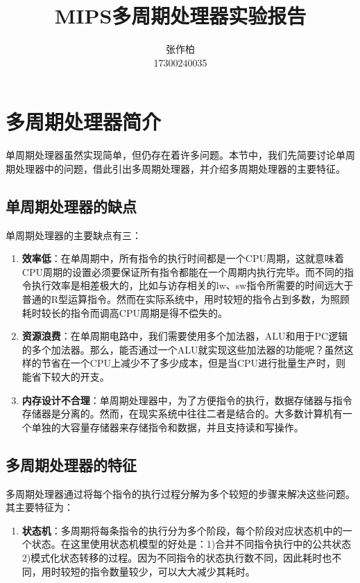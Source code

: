 \documentclass[12pt]{article} %
\title{\textbf{MIPS多周期处理器实验报告}}
\author{张作柏\\17300240035}
\begin{document}
\begin{sloppypar}
\maketitle

\pagestyle{fancy}
\lhead{\textbf{{\thetitle}}}
\rhead{\textbf{\nouppercase{\firstleftmark}}}
\cfoot{\thepage}

\thispagestyle{empty}
\tableofcontents
\clearpage

\setcounter{page}{1}

\section{多周期处理器简介}

单周期处理器虽然实现简单，但仍存在着许多问题。本节中，我们先简要讨论单周期处理器中的问题，借此引出多周期处理器，并介绍多周期处理器的主要特征。

\subsection{单周期处理器的缺点}

单周期处理器的主要缺点有三：
\begin{enumerate}
\item {\bf 效率低}：在单周期中，所有指令的执行时间都是一个CPU周期，这就意味着CPU周期的设置必须要保证所有指令都能在一个周期内执行完毕。而不同的指令执行效率是相差极大的，比如与访存相关的lw、sw指令所需要的时间远大于普通的R型运算指令。然而在实际系统中，用时较短的指令占到多数，为照顾耗时较长的指令而调高CPU周期是得不偿失的。

\item {\bf 资源浪费}：在单周期电路中，我们需要使用多个加法器，ALU和用于PC逻辑的多个加法器。那么，能否通过一个ALU就实现这些加法器的功能呢？虽然这样的节省在一个CPU上减少不了多少成本，但是当CPU进行批量生产时，则能省下较大的开支。

\item {\bf 内存设计不合理}：单周期处理器中，为了方便指令的执行，数据存储器与指令存储器是分离的。然而，在现实系统中往往二者是结合的。大多数计算机有一个单独的大容量存储器来存储指令和数据，并且支持读和写操作。
\end{enumerate}

\subsection{多周期处理器的特征}

多周期处理器通过将每个指令的执行过程分解为多个较短的步骤来解决这些问题。其主要特征为：
\begin{enumerate}
\item {\bf 状态机}：多周期将每条指令的执行分为多个阶段，每个阶段对应状态机中的一个状态。在这里使用状态机模型的好处是：1)合并不同指令执行中的公共状态 2)模式化状态转移的过程。因为不同指令的状态执行数不同，因此耗时也不同，用时较短的指令数量较少，可以大大减少其耗时。


\end{enumerate}
\end{sloppypar}
\end{document}
